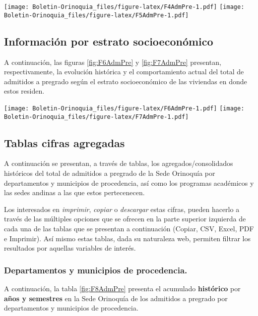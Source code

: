 \documentclass[
]{book}
\begin{document}
\texttt{[image: Boletin-Orinoquia\_files/figure-latex/F4AdmPre-1.pdf]}
\texttt{[image: Boletin-Orinoquia\_files/figure-latex/F5AdmPre-1.pdf]}

\hypertarget{informaciuxf3n-por-estrato-socioeconuxf3mico-1}{%
\subsection{Información por estrato socioeconómico}\label{informaciuxf3n-por-estrato-socioeconuxf3mico-1}}

A continuación, las figuras \ref{fig:F6AdmPre} y \ref{fig:F7AdmPre} presentan, respectivamente, la evolución histórica y el comportamiento actual del total de admitidos a pregrado según el estrato socioeconómico de las viviendas en donde estos residen.

\texttt{[image: Boletin-Orinoquia\_files/figure-latex/F6AdmPre-1.pdf]}
\texttt{[image: Boletin-Orinoquia\_files/figure-latex/F7AdmPre-1.pdf]}

\hypertarget{tablas-cifras-agregadas-1}{%
\subsection{Tablas cifras agregadas}\label{tablas-cifras-agregadas-1}}

A continuación se presentan, a través de tablas, los agregados/consolidados históricos del total de admitidos a pregrado de la Sede Orinoquía por departamentos y municipios de procedencia, así como los programas académicos y las sedes andinas a las que estos pertecenecen.

Los interesados en \emph{imprimir}, \emph{copiar} o \emph{descargar} estas cifras, pueden hacerlo a través de las múltiples opciones que se ofrecen en la parte superior izquierda de cada una de las tablas que se presentan a continuación (Copiar, CSV, Excel, PDF e Imprimir). Así mismo estas tablas, dada su naturaleza web, permiten filtrar los resultados por aquellas variables de interés.

\hypertarget{departamentos-y-municipios-de-procedencia.}{%
\subsubsection{Departamentos y municipios de procedencia.}\label{departamentos-y-municipios-de-procedencia.}}

A continuación, la tabla \ref{fig:F8AdmPre} presenta el acumulado \textbf{histórico} por \textbf{años y semestres} en la Sede Orinoquía de los admitidos a pregrado por departamentos y municipios de procedencia.
\end{document}
